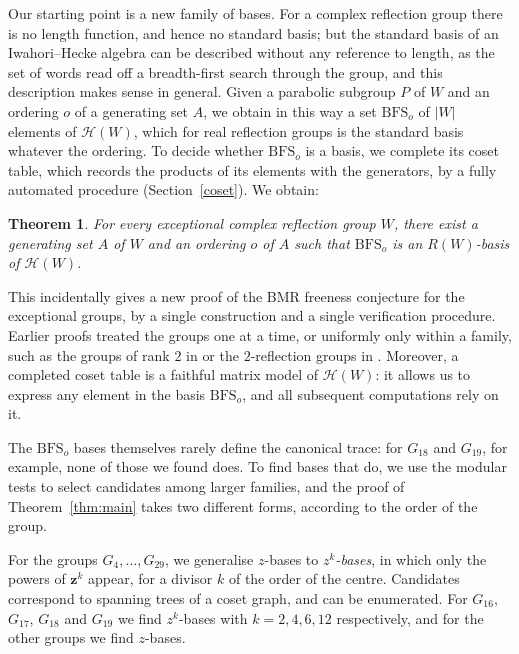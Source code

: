 \documentclass[11pt, reqno]{amsart}
\numberwithin{equation}{section}
\newtheorem{theorem}{Theorem}[section]
\theoremstyle{remark}
\begin{document}
Our starting point is a new family of bases. For a complex reflection
group there is no length function, and hence no standard basis; but the
standard basis of an Iwahori--Hecke algebra can be described without
any reference to length, as the set of words read off a breadth-first
search through the group, and this description makes sense in general.
Given a parabolic subgroup $P$ of $W$ and an ordering $o$ of a
generating set $A$, we obtain in this way a set $\mathrm{BFS}_o$ of $|W|$
elements of $\mathcal H(W)$, which for real reflection groups is the
standard basis whatever the ordering. To decide whether
$\mathrm{BFS}_o$ is a basis, we complete its coset table, which records
the products of its elements with the generators, by a fully automated procedure (Section~\ref{coset}). We obtain:

\begin{theorem}\label{thm:bfs}
	For every exceptional complex reflection group $W$, there exist a generating set $A$ of $W$ and an ordering $o$ of $A$ such that $\mathrm{BFS}_o$ is an $R(W)$-basis of $\mathcal H(W)$.
\end{theorem}

This incidentally gives a new proof of the BMR freeness conjecture for the
exceptional groups, by a single construction and a single verification
procedure. Earlier proofs treated the groups one at a time, or
uniformly only within a family, such as the groups of rank $2$ in
\cite{Tsu} or the $2$-reflection groups in \cite{MaPf}. Moreover, a
completed coset table is a faithful matrix model of $\mathcal H(W)$: it
allows us to express any element in the basis $\mathrm{BFS}_o$, and all
subsequent computations rely on it.

The $\mathrm{BFS}_o$ bases themselves rarely define the canonical
trace: for $G_{18}$ and $G_{19}$, for example, none of those we found
does. To find bases that do, we use the modular tests to select candidates among larger families, and the proof of Theorem~\ref{thm:main} takes two different forms, according to the order of the group.

For the groups $G_{4},\dots,G_{29}$, we generalise $z$-bases to
\emph{$z^k$-bases}, in which only the powers of $\mathbf z^k$ appear,
for a divisor $k$ of the order of the centre. Candidates correspond to
spanning trees of a coset graph, and can be enumerated. For $G_{16}$,
$G_{17}$, $G_{18}$ and $G_{19}$ we find $z^k$-bases with $k=2,4,6,12$
respectively, and for the other groups we find $z$-bases.
\end{document}
